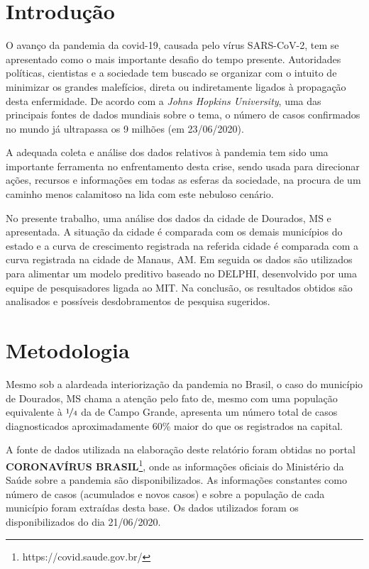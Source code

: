 \documentclass[12pt]{article}
\begin{document}
\section{Introdução}

O avanço da pandemia da covid-19, causada pelo vírus SARS-CoV-2, tem se apresentado como o mais importante desafio do tempo presente. Autoridades políticas, cientistas e a sociedade tem buscado se organizar com o intuito de minimizar os grandes malefícios, direta ou indiretamente ligados à propagação desta enfermidade. De acordo com a \textit{Johns Hopkins University}, uma das principais fontes de dados mundiais sobre o tema, o número de casos confirmados no mundo já ultrapassa os 9 milhões (em 23/06/2020).

A adequada coleta e análise dos dados relativos à pandemia tem sido uma importante ferramenta no enfrentamento desta crise, sendo usada para direcionar ações, recursos e informações em todas as esferas da sociedade, na procura de um caminho menos calamitoso na lida com este nebuloso cenário.

No presente trabalho, uma análise dos dados da cidade de Dourados, MS e apresentada. A situação da cidade é comparada com os demais municípios do estado e a curva de crescimento registrada na referida cidade é comparada com a curva registrada na cidade de Manaus, AM. Em seguida os dados são utilizados para alimentar um modelo preditivo baseado no DELPHI, desenvolvido por uma equipe de pesquisadores ligada ao MIT. Na conclusão, os resultados obtidos são analisados e possíveis desdobramentos de pesquisa sugeridos. 

\section{Metodologia}\label{sec:met}

Mesmo sob a alardeada interiorização da pandemia no Brasil, o caso do município de Dourados, MS chama a atenção pelo fato de, mesmo com uma população equivalente à \(\nicefrac{1}{4}\) da de Campo Grande, apresenta um número total de casos diagnosticados aproximadamente 60\% maior do que os registrados na capital.

A fonte de dados utilizada na elaboração deste relatório foram obtidas no portal \textbf{CORONAVÍRUS BRASIL}\footnote{https://covid.saude.gov.br/}, onde as informações oficiais do Ministério da Saúde sobre a pandemia são disponibilizados. As informações constantes como número de casos (acumulados e novos casos) e sobre a população de cada município foram extraídas desta base. Os dados utilizados foram os disponibilizados do dia 21/06/2020. 
\end{document}
